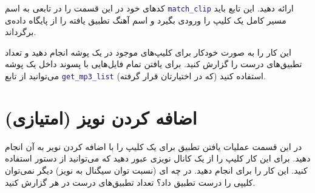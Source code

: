 \documentclass{utsignal}
\begin{document}
	کد‌های خود در این قسمت را در تابعی به اسم \lstinline[language=Matlab]{match_clip} ارائه دهید. این تابع باید مسیر کامل یک کلیپ را ورودی بگیرد و اسم آهنگ تطبیق یافته را از پایگاه داده‌ی  برگرداند.
	
	این کار را به صورت خودکار برای کلیپ‌های موجود در یک پوشه انجام دهید و تعداد تطبیق‌های درست را گزارش کنید. برای یافتن تمام فایل‌هایی با پسوند  داخل یک پوشه می‌توانید از تابع \lstinline[language=Matlab]{get_mp3_list} (که در اختیارتان قرار گرفته) استفاده کنید.
	
	\section{اضافه کردن نویز (امتیازی)}
	در این قسمت عملیات یافتن تطبیق برای یک کلیپ را با اضافه کردن نویر به آن انجام دهید. برای این کار کلیپ را از یک کانال نویزی عبور دهید که می‌توانید از دستور  استفاده کنید. این کار را برای  انجام دهید. در چه ای (نسبت توان سیگنال به نویز) دیگر نمی‌توان کلیپی را درست تطبیق داد؟ تعداد تطبیق‌های درست در هر  گزارش کنید.
\end{document}
